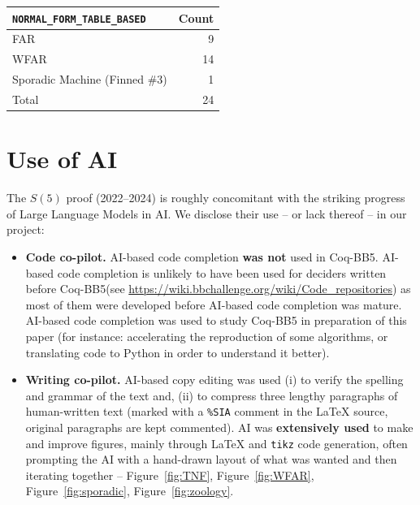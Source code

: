 \documentclass[a4paper,british]{article}
\theoremstyle{definition} %
\numberwithin{equation}{section}
\theoremstyle{definition} %
\newcommand{\CoqBB}{Coq-BB5\xspace}
\begin{document}
\begin{table}[H]
\begin{minipage}{0.35\linewidth}
\begin{tabular}{|lr|}
            \hline
            \texttt{NORMAL\_FORM\_TABLE\_BASED} & Count \\
            \hline
            FAR                                 & 9     \\
            WFAR                                & 14    \\
            Sporadic Machine (Finned \#3)       & 1     \\
            \hline
            Total                               & 24    \\
            \hline
        \end{tabular}
    \end{minipage}
\end{table}

\vspace{-1em}
\section{Use of AI}

The $S(5)$ proof (2022--2024) is roughly concomitant with the striking progress of Large Language Models in AI. We disclose their use -- or lack thereof -- in our project:

\begin{itemize}
    \item \textbf{Code co-pilot.} AI-based code completion \textbf{was not} used in \CoqBB. AI-based code completion is unlikely to have been used for deciders written before \CoqBB (see \url{https://wiki.bbchallenge.org/wiki/Code_repositories}) as most of them were developed before AI-based code completion was mature. AI-based code completion was used to study \CoqBB in preparation of this paper (for instance: accelerating the reproduction of some algorithms, or translating \Coq code to Python in order to understand it better).
    \item \textbf{Writing co-pilot.} AI-based copy editing was used (i) to verify the spelling and grammar of the text and, (ii) to compress three lengthy paragraphs of human-written text (marked with a \texttt{\%SIA} comment in the LaTeX source, original paragraphs are kept commented). AI was \textbf{extensively used} to make and improve figures, mainly through LaTeX and \texttt{tikz} code generation, often prompting the AI with a hand-drawn layout of what was wanted and then iterating together -- \eg Figure~\ref{fig:TNF}, Figure~\ref{fig:WFAR}, Figure~\ref{fig:sporadic}, Figure~\ref{fig:zoology}.

\end{itemize}
\end{document}
